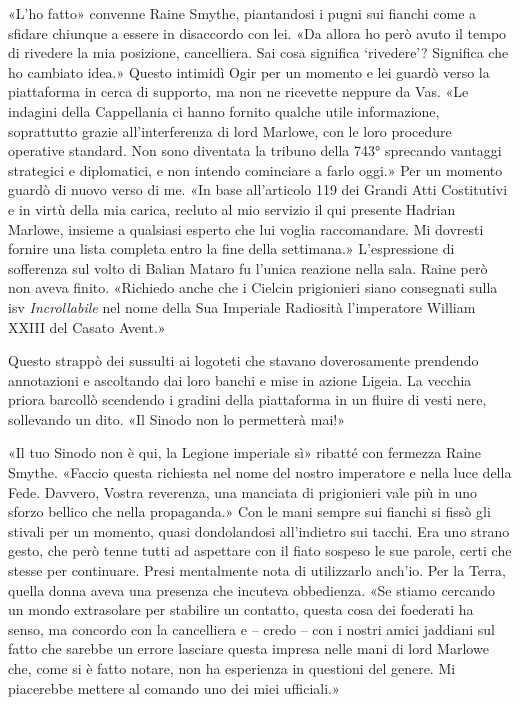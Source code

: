 «L'ho fatto» convenne Raine Smythe, piantandosi i pugni sui fianchi come
a sfidare chiunque a essere in disaccordo con lei. «Da allora ho però
avuto il tempo di rivedere la mia posizione, cancelliera. Sai cosa
significa `rivedere'? Significa che ho cambiato idea.» Questo intimidì
Ogir per un momento e \emph{} lei guardò verso la piattaforma in cerca
di supporto, ma non ne ricevette neppure da Vas. «Le indagini della
Cappellania ci hanno fornito qualche utile informazione, soprattutto
grazie all'interferenza di lord Marlowe, con le loro procedure operative
standard. Non sono diventata la tribuno della 743° sprecando vantaggi
strategici e diplomatici, e non intendo cominciare a farlo oggi.» Per un
momento guardò di nuovo verso di me. «In base all'articolo 119 dei
Grandi Atti Costitutivi e in virtù della mia carica, recluto al mio
servizio il qui presente Hadrian Marlowe, insieme a qualsiasi esperto
che lui voglia raccomandare. Mi dovresti fornire una lista completa
entro la fine della settimana.» L'espressione di sofferenza sul volto di
Balian Mataro fu l'unica reazione nella sala. Raine però non aveva
finito. «Richiedo anche che i Cielcin prigionieri siano consegnati sulla
\foreignlanguage{italian}{isv} \emph{Incrollabile} nel nome della Sua
Imperiale Radiosità l'imperatore William XXIII del Casato Avent.»

Questo strappò dei sussulti ai logoteti che stavano doverosamente
prendendo annotazioni e ascoltando dai loro banchi e mise in azione
Ligeia. La vecchia priora barcollò scendendo i gradini della piattaforma
in un fluire di vesti nere, sollevando un dito. «Il Sinodo non lo
permetterà mai!»

«Il tuo Sinodo non è qui, la Legione imperiale sì» ribatté con fermezza
Raine Smythe. «Faccio questa richiesta nel nome del nostro imperatore e
nella luce della Fede. Davvero, Vostra reverenza, una manciata di
prigionieri vale più in uno sforzo bellico che nella propaganda.» Con le
mani sempre sui fianchi si fissò gli stivali per un momento, quasi
dondolandosi all'indietro sui tacchi. Era uno strano gesto, che però
tenne tutti ad aspettare con il fiato sospeso le sue parole, certi che
stesse per continuare. Presi mentalmente nota di utilizzarlo anch'io.
Per la Terra, quella donna aveva una presenza che incuteva obbedienza.
«Se stiamo cercando un mondo extrasolare per stabilire un contatto,
questa cosa dei foederati ha senso, ma concordo con la cancelliera e --
credo -- con i nostri amici jaddiani sul fatto che sarebbe un errore
lasciare questa impresa nelle mani di lord Marlowe che, come si è fatto
notare, non ha esperienza in questioni del genere. Mi piacerebbe mettere
al comando uno dei miei ufficiali.»


